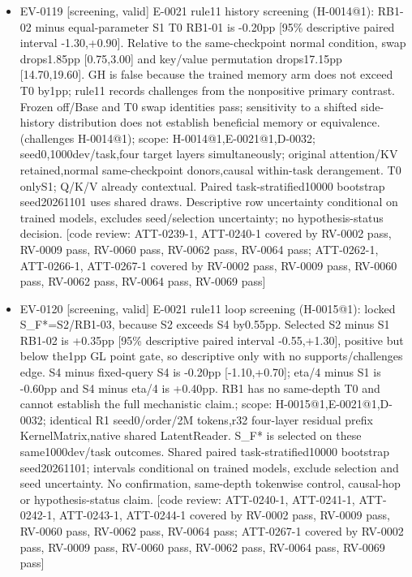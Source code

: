 \documentclass[11pt]{article}
\begin{document}
\begin{itemize}
\item EV-0119 [screening, valid] E-0021 rule11 history screening (H-0014@1): RB1-02 minus equal-parameter S1 T0 RB1-01 is -0.20pp [95\% descriptive paired interval -1.30,+0.90]. Relative to the same-checkpoint normal condition, swap drops1.85pp [0.75,3.00] and key/value permutation drops17.15pp [14.70,19.60]. GH is false because the trained memory arm does not exceed T0 by1pp; rule11 records challenges from the nonpositive primary contrast. Frozen off/Base and T0 swap identities pass; sensitivity to a shifted side-history distribution does not establish beneficial memory or equivalence. (challenges H-0014@1); scope: H-0014@1,E-0021@1,D-0032; seed0,1000dev/task,four target layers simultaneously; original attention/KV retained,normal same-checkpoint donors,causal within-task derangement. T0 onlyS1; Q/K/V already contextual. Paired task-stratified10000 bootstrap seed20261101 uses shared draws. Descriptive row uncertainty conditional on trained models, excludes seed/selection uncertainty; no hypothesis-status decision. [code review: ATT-0239-1, ATT-0240-1 covered by RV-0002 pass, RV-0009 pass, RV-0060 pass, RV-0062 pass, RV-0064 pass; ATT-0262-1, ATT-0266-1, ATT-0267-1 covered by RV-0002 pass, RV-0009 pass, RV-0060 pass, RV-0062 pass, RV-0064 pass, RV-0069 pass]
\item EV-0120 [screening, valid] E-0021 rule11 loop screening (H-0015@1): locked S\_F*=S2/RB1-03, because S2 exceeds S4 by0.55pp. Selected S2 minus S1 RB1-02 is +0.35pp [95\% descriptive paired interval -0.55,+1.30], positive but below the1pp GL point gate, so descriptive only with no supports/challenges edge. S4 minus fixed-query S4 is -0.20pp [-1.10,+0.70]; eta/4 minus S1 is -0.60pp and S4 minus eta/4 is +0.40pp. RB1 has no same-depth T0 and cannot establish the full mechanistic claim.; scope: H-0015@1,E-0021@1,D-0032; identical R1 seed0/order/2M tokens,r32 four-layer residual prefix KernelMatrix,native shared LatentReader. S\_F* is selected on these same1000dev/task outcomes. Shared paired task-stratified10000 bootstrap seed20261101; intervals conditional on trained models, exclude selection and seed uncertainty. No confirmation, same-depth tokenwise control, causal-hop or hypothesis-status claim. [code review: ATT-0240-1, ATT-0241-1, ATT-0242-1, ATT-0243-1, ATT-0244-1 covered by RV-0002 pass, RV-0009 pass, RV-0060 pass, RV-0062 pass, RV-0064 pass; ATT-0267-1 covered by RV-0002 pass, RV-0009 pass, RV-0060 pass, RV-0062 pass, RV-0064 pass, RV-0069 pass]

\end{itemize}
\end{document}
